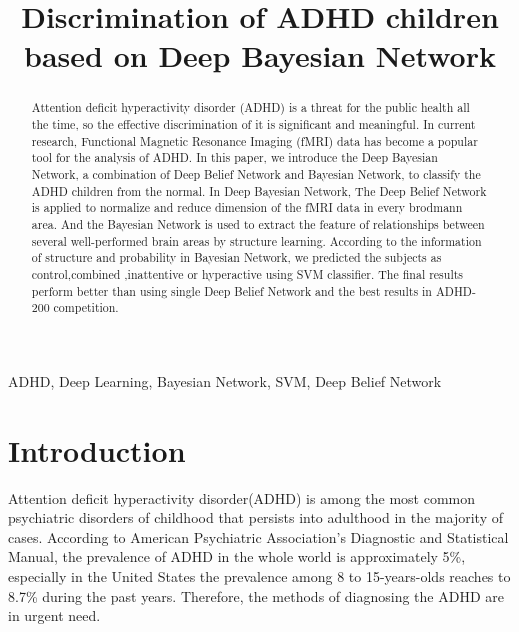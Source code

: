 \documentclass[10pt,twocolumn,letterpaper]{article}
\begin{document}
\title{Discrimination of ADHD children based on Deep Bayesian Network}
%
\address{Tongji University,
Department of Computer Science and Technology\\}
\maketitle


\begin{keywords}
ADHD, Deep Learning, Bayesian Network, SVM, Deep Belief Network
\end{keywords}

\begin{abstract}
   Attention deficit hyperactivity disorder (ADHD) is a threat for the public health all the time, so the effective discrimination of it is significant and meaningful. In current research, Functional Magnetic Resonance Imaging (fMRI) data has become a popular tool for the analysis of ADHD. In this paper, we introduce the Deep Bayesian Network, a combination of Deep Belief Network and Bayesian Network, to classify the ADHD children from the normal. In Deep Bayesian Network, The Deep Belief Network is applied to  normalize and reduce dimension of the fMRI data in every brodmann area. And the Bayesian Network is used to extract the feature of relationships between several well-performed brain areas by structure learning. According to the information of structure and probability in Bayesian Network, we predicted the subjects as control,combined ,inattentive or hyperactive using SVM classifier. The final results perform better than using single Deep Belief Network and the best results in ADHD-200 competition. 

\end{abstract}

\section{Introduction}
Attention deficit hyperactivity disorder(ADHD) is among the most common psychiatric disorders of childhood that persists into adulthood in the majority of cases\cite{1}. According to American Psychiatric Association's Diagnostic and Statistical Manual, the prevalence of ADHD in the whole world is approximately 5\%, especially in the United States the prevalence among 8 to 15-years-olds reaches to 8.7\% during the past years. Therefore, the methods of diagnosing the ADHD are in urgent need.
 
\end{document}

